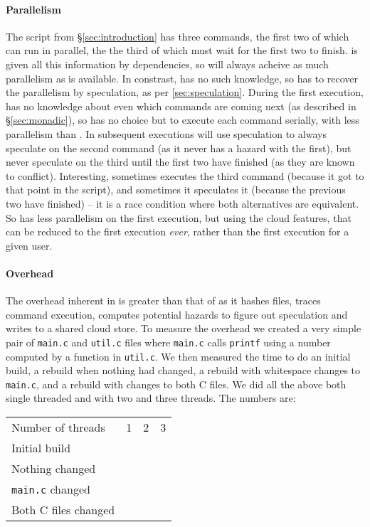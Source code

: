 \paragraph{Parallelism} The script from \S\ref{sec:introduction} has three commands, the first two of which can run in parallel, the the third of which must wait for the first two to finish. \Make is given all this information by dependencies, so will always acheive as much parallelism as is available. In constrast, \Rattle has no such knowledge, so has to recover the parallelism by speculation, as per \ref{sec:speculation}. During the first execution, \Rattle has no knowledge about even which commands are coming next (as described in \S\ref{sec:monadic}), so has no choice but to execute each command serially, with less parallelism than \Make. In subsequent executions \Rattle will use speculation to always speculate on the second command (as it never has a hazard with the first), but never speculate on the third until the first two have finished (as they are known to conflict). Interesting, sometimes \Rattle executes the third command (because it got to that point in the script), and sometimes it speculates it (because the previous two have finished) -- it is a race condition where both alternatives are equivalent. So \Rattle has less parallelism on the first execution, but using the cloud features, that can be reduced to the first execution \emph{ever}, rather than the first execution for a given user.

\paragraph{Overhead} The overhead inherent in \Rattle is greater than that of \Make as it hashes files, traces command execution, computes potential hazards to figure out speculation and writes to a shared cloud store. To measure the overhead we created a very simple pair of \texttt{main.c} and \texttt{util.c} files where \texttt{main.c} calls \texttt{printf} using a number computed by a function in \texttt{util.c}. We then measured the time to do an initial build, a rebuild when nothing had changed, a rebuild with whitespace changes to \texttt{main.c}, and a rebuild with changes to both C files. We did all the above both single threaded and with two and three threads. The numbers are:

\begin{tabular}{|l|r|r|r|}
Number of threads & 1 & 2 & 3 \\
Initial build \\
Nothing changed \\
\texttt{main.c} changed \\
Both C files changed \\
\end{tabular}

